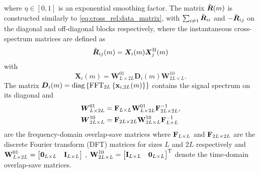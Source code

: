 \documentclass{article}
\begin{document}
where \(\eta \in [0,1]\) is an exponential smoothing factor.
The matrix \(\tilde{{\bm{{R}}}}(m)\) is constructed similarly to \eqref{eq:cross_rel:data_matrix}, with \(\sum_{i \neq 1} \tilde{{\bm{{R}}}}_{ii}\) and \(-\tilde{{\bm{{R}}}}_{ij}\) on the diagonal and off-diagonal blocks respectively, where the instantaneous cross-spectrum matrices are defined as
\begin{equation}
    \tilde{{\bm{{R}}}}_{ij}(m) = \bm{X}_{i} (m) \bm{X}_{j}^{\mathrm{H}} (m)
\end{equation}
with 
\begin{equation}
    \bm{X}_{i}(m) = \bm{{W}}^{01}_{L \times 2L} \bm{{D}}_{i}(m) \bm{{W}}^{10}_{2L \times L}.
\end{equation}
The matrix \(\bm{{D}}_{i}(m) = \operatorname{diag} \left\{ \operatorname{FFT}_{2L} \left\{ \bm{\mathrm{x}}_{i,2L}(m) \right\} \right\}\) contains the  signal spectrum on its diagonal and
\begin{align}
    \bm{{W}}_{L \times 2L}^{01} &= \bm{\mathrm{F}}_{L \times L} \bm{\mathrm{W}}_{L \times 2L}^{01} \bm{\mathrm{F}}_{2L \times 2L}^{-1},\\
    \bm{{W}}_{2L \times L}^{10} &= \bm{\mathrm{F}}_{2L \times 2L} \bm{\mathrm{W}}_{2L \times L}^{10} \bm{\mathrm{F}}_{L \times L}^{-1}\label{eq:frequency_domain:overlap}
\end{align}
are the frequency-domain overlap-save matrices where \(\bm{\mathrm{F}}_{L \times L}\) and \(\bm{\mathrm{F}}_{2L \times 2L}\) are the discrete Fourier transform (DFT) matrices for sizes \(L\) and \(2L\) respectively and \(
    \bm{\mathrm{W}}_{L \times 2L}^{01} = \begin{bmatrix}
        \bm{\mathrm{0}}_{L \times L} & \bm{\mathrm{I}}_{L \times L}
    \end{bmatrix}\)
, \(
    \bm{\mathrm{W}}_{2L \times L}^{10} = \begin{bmatrix}
        \bm{\mathrm{I}}_{L \times L} & \bm{\mathrm{0}}_{L \times L}
    \end{bmatrix}^{\mathrm{T}}\)
denote the time-domain overlap-save matrices.
\end{document}
